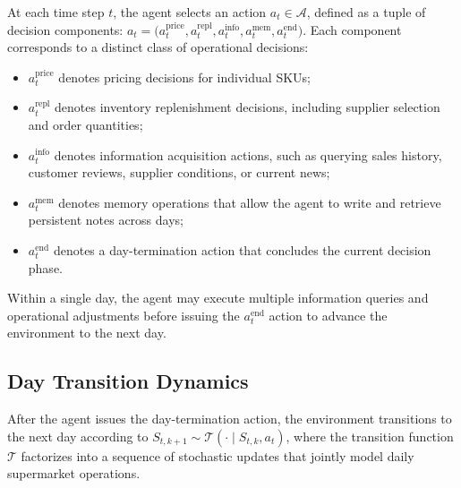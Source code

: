 At each time step $t$, the agent selects an action $a_t \in \mathcal{A}$, defined as a tuple of decision components:
$a_t =
\big(
a_t^{\text{price}},
a_t^{\text{repl}},
a_t^{\text{info}},
a_t^{\text{mem}},
a_t^{\text{end}}
\big)$.
Each component corresponds to a distinct class of operational decisions:
\begin{itemize}[leftmargin=*]
    \item $a_t^{\text{price}}$ denotes pricing decisions for individual SKUs;
    \item $a_t^{\text{repl}}$ denotes inventory replenishment decisions, including supplier selection and order quantities;
    \item $a_t^{\text{info}}$ denotes information acquisition actions, such as querying sales history, customer reviews, supplier conditions, or current news;
    \item $a_t^{\text{mem}}$ denotes memory operations that allow the agent to write and retrieve persistent notes across days;
    \item $a_t^{\text{end}}$ denotes a day-termination action that concludes the current decision phase.
\end{itemize}

Within a single day, the agent may execute multiple information queries and operational adjustments before issuing the $a_t^{\text{end}}$ action to advance the environment to the next day.

\subsection{Day Transition Dynamics}

After the agent issues the day-termination action, the environment transitions to the next day according to
$S_{t,k+1} \sim \mathcal{T}(\cdot \mid S_{t,k}, a_t)$,
where the transition function $\mathcal{T}$ factorizes into a sequence of stochastic updates that jointly model daily supermarket operations.


